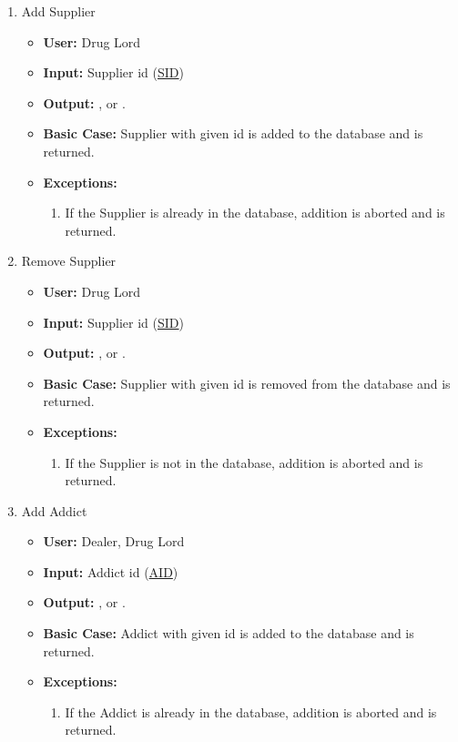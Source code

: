 \documentclass[11pt, oneside]{article}   	%
\theoremstyle{definition}
\theoremstyle{remark}
\begin{document}
\begin{enumerate}
	\item Add Supplier
	\begin{itemize}
		\item \textbf{User:} Drug Lord
		\item \textbf{Input:} Supplier id (\underline{SID})
		\item \textbf{Output:} , or .
		\item \textbf{Basic Case:} Supplier with given id is added to the database and  is returned.
		\item \textbf{Exceptions:}
		\begin{enumerate}
			\item If the Supplier is already in the database, addition is aborted and  is returned.
		\end{enumerate}
	\end{itemize}
		
		
	\item Remove Supplier
	\begin{itemize}
		\item \textbf{User:} Drug Lord
		\item \textbf{Input:} Supplier id (\underline{SID})
		\item \textbf{Output:} , or .
		\item \textbf{Basic Case:} Supplier with given id is removed from the database and  is returned.
		\item \textbf{Exceptions:}
		\begin{enumerate}
			\item If the Supplier is not in the database, addition is aborted and  is returned.
		\end{enumerate}
	\end{itemize}
		
		
	\item Add Addict
	\begin{itemize}
		\item \textbf{User:} Dealer, Drug Lord
		\item \textbf{Input:} Addict id (\underline{AID})
		\item \textbf{Output:} , or .
		\item \textbf{Basic Case:} Addict with given id is added to the database and  is returned.
		\item \textbf{Exceptions:}
		\begin{enumerate}
			\item If the Addict is already in the database, addition is aborted and  is returned.
		\end{enumerate}
	\end{itemize}
		

\end{enumerate}
\end{document}
